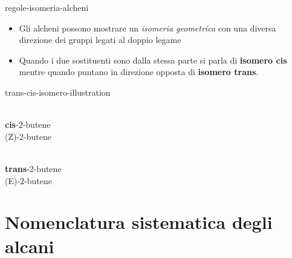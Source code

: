 \documentclass[preview]{standalone}
\begin{document}
\begin{snippet}{regole-isomeria-alcheni}
    \begin{itemize}
        \item Gli alcheni possono mostrare un \textit{isomeria geometrica} con una diversa direzione dei gruppi
        legati al doppio legame
        \item Quando i due sostituenti sono dalla stessa parte si parla di \textbf{isomero cis} mentre quando
        puntano in direzione opposta di \textbf{isomero trans}.
    \end{itemize}
\end{snippet}

\begin{snippet}{trans-cis-isomero-illustration}
    \begin{minipage}{0.5\textwidth}
        \begin{center}
            \\
            \textbf{cis}-2-butene \\
            (Z)-2-butene
        \end{center}
    \end{minipage}
    \begin{minipage}{0.5\textwidth}
        \begin{center}
            \\
            \textbf{trans}-2-butene \\
            (E)-2-butene
        \end{center}
    \end{minipage}
\end{snippet}

\section{Nomenclatura sistematica degli alcani}

\end{document}
